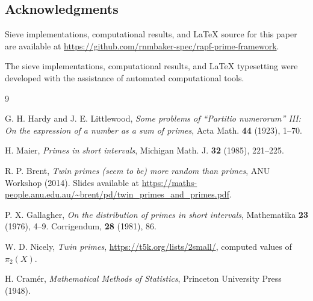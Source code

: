 \documentclass[11pt]{article}
\begin{document}
\subsection*{Acknowledgments}

Sieve implementations, computational results, and LaTeX source for this paper are available at \url{https://github.com/rnmbaker-spec/rapf-prime-framework}.

The sieve implementations, computational results, and LaTeX typesetting were developed with the assistance of automated computational tools.

\begin{thebibliography}{9}

G. H. Hardy and J. E. Littlewood,
\textit{Some problems of ``Partitio numerorum'' III: On the expression of a number as a sum of primes},
Acta Math. \textbf{44} (1923), 1--70.

H. Maier,
\textit{Primes in short intervals},
Michigan Math. J. \textbf{32} (1985), 221--225.

R. P. Brent,
\textit{Twin primes (seem to be) more random than primes},
ANU Workshop (2014). Slides available at \url{https://maths-people.anu.edu.au/~brent/pd/twin_primes_and_primes.pdf}.

P. X. Gallagher,
\textit{On the distribution of primes in short intervals},
Mathematika \textbf{23} (1976), 4--9. Corrigendum, \textbf{28} (1981), 86.

W. D. Nicely,
\textit{Twin primes},
\url{https://t5k.org/lists/2small/}, computed values of $\pi_2(X)$.

H. Cram\'{e}r,
\textit{Mathematical Methods of Statistics},
Princeton University Press (1948).

\end{thebibliography}
\end{document}

